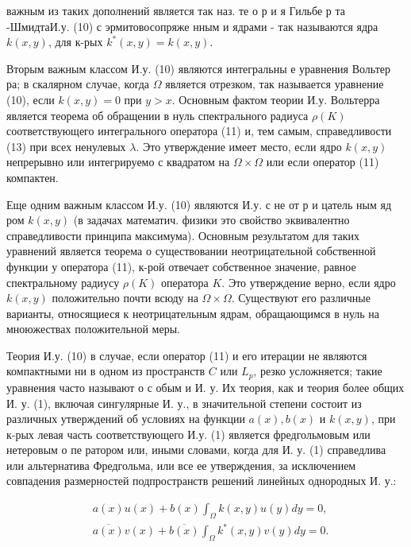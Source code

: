 \documentclass[10pt]{article}
\begin{document}
важным из таких дополнений является так наз. те о р и я Гильбе р та -ШмидтаИ.у. (10) с эрмитовосопряже нным и ядрами - так называются ядра $k(x, y)$, для к-рых $k^{*}(x, y)=k(x, y)$.



Вторым важным классом И.у. (10) являются интегральны е уравнения Вольтер ра; в скалярном случае, когда $\Omega$ является отрезком, так называется уравнение (10), если $k(x, y)=0$ при $y>x$. Основным фактом теории И.у. Вольтерра является теорема об обращении в нуль спектрального радиуса $\rho(K)$ соответствующего интегрального оператора (11) и, тем самым, справедливости (13) при всех ненулевых $\lambda$. Это утверждение имеет место, если ядро $k(x, y)$ непрерывно или интегрируемо с квадратом на $\Omega \times \Omega$ или если оператор (11) компактен.



Еще одним важным классом И.у. (10) являются И.у. с не от р и цатель ным яд ром $k(x, y)$ (в задачах математич. физики это свойство эквивалентно справедливости принципа максимума). Основным результатом для таких уравнений является теорема о существовании неотрицательной собственной функции у оператора (11), к-рой отвечает собственное значение, равное спектральному радиусу $\rho(K)$ оператора $K$. Это утверждение верно, если ядро $k(x, y)$ положительно почти всюду на $\Omega \times \Omega$. Существуют его различные варианты, относящиеся к неотрицательным ядрам, обращающимся в нуль на мноюжествах положительной меры.



Теория И.у. (10) в случае, если оператор (11) и его итерации не являются компактными ни в одном из пространств $C$ или $L_{p}$, резко усложняется; такие уравнения часто называют о с обым и И. у. Их теория, как и теория более общих И. у. (1), включая сингулярные И. у., в значительной степени состоит из различных утверждений об условиях на функции $a(x), b(x)$ и $k(x, y)$, при к-рых левая часть соответствующего И.у. (1) является фредгольмовым или нетеровым о пе ратором или, иными словами, когда для И. у. (1) справедлива или альтернатива Фредгольма, или все ее утверждения, за исключением совпадения размерностей подпространств решений линейных однородных И. у.:



\[

\begin{aligned}

& a(x) u(x)+b(x) \int_{\Omega} k(x, y) u(y) d y=0, \\

& \overline{a(x)} v(x)+\overline{b(x)} \int_{\Omega} k^{*}(x, y) v(y) d y=0 .

\end{aligned}

\]
\end{document}
